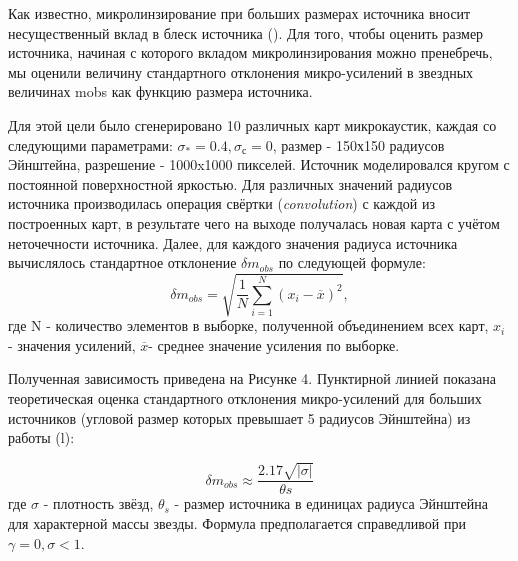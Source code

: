 Как известно, микролинзирование при больших размерах источника вносит несущественный вклад в блеск источника (\cite{schneider1992}). Для того, чтобы оценить размер источника, начиная с которого вкладом микролинзирования можно пренебречь, мы оценили величину стандартного отклонения микро-усилений в звездных величинах mobs как функцию размера источника. 

Для этой цели было сгенерировано 10 различных карт микрокаустик, каждая со следующими параметрами: $\sigma_*=0.4, \sigma_с=0$, размер - 150х150 радиусов Эйнштейна, разрешение - 1000x1000 пикселей. Источник моделировался кругом с постоянной поверхностной яркостью. Для различных значений радиусов источника производилась операция свёртки (\textit{convolution}) с каждой из построенных карт, в результате чего на выходе получалась новая карта с учётом неточечности источника. Далее, для каждого значения радиуса источника вычислялось стандартное отклонение  $\delta m_{o b s}$ по следующей формуле: 
\begin{equation}
\delta m_{o b s}=\sqrt{\frac{1}{N} \sum_{i=1}^{N}\left(x_{i}-\overline{x}\right)^{2}},
\end{equation}
где N - количество элементов в выборке, полученной объединением всех карт, $x_i$ - значения усилений, $\overline x$- среднее значение усиления по выборке.

Полученная зависимость приведена на Рисунке 4. Пунктирной линией показана теоретическая оценка стандартного отклонения микро-усилений для больших источников (угловой размер которых превышает 5 радиусов Эйнштейна) из работы (\cite{refsdalstabell1991}l):

\begin{equation}
\delta m_{o b s} \approx \frac{2.17 \sqrt{|\sigma|}}{\theta s}
\end{equation}
где $\sigma$ - плотность звёзд, $\theta_s$ - размер источника в единицах радиуса Эйнштейна для характерной массы звезды. Формула предполагается справедливой при $\gamma=0, \sigma < 1$. 

